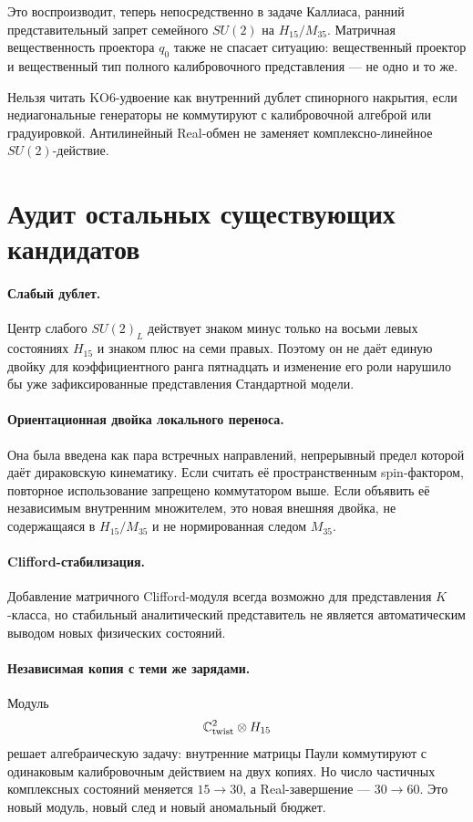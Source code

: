 Это воспроизводит, теперь непосредственно в задаче Каллиаса, ранний
представительный запрет семейного $SU(2)$ на $H_{15}/M_{35}$. Матричная
вещественность проектора $q_0$ также не спасает ситуацию: вещественный
проектор и вещественный тип полного калибровочного представления --- не
одно и то же.

\begin{nogocriterion}
Нельзя читать KO6-удвоение как внутренний дублет спинорного накрытия, если
недиагональные генераторы не коммутируют с калибровочной алгеброй или
градуировкой. Антилинейный Real-обмен не заменяет комплексно-линейное
$SU(2)$-действие.
\end{nogocriterion}

\section{Аудит остальных существующих кандидатов}

\paragraph{Слабый дублет.}
Центр слабого $SU(2)_L$ действует знаком минус только на восьми левых
состояниях $H_{15}$ и знаком плюс на семи правых. Поэтому он не даёт
единую двойку для коэффициентного ранга пятнадцать и изменение его роли
нарушило бы уже зафиксированные представления Стандартной модели.

\paragraph{Ориентационная двойка локального переноса.}
Она была введена как пара встречных направлений, непрерывный предел
которой даёт дираковскую кинематику. Если считать её пространственным
spin-фактором, повторное использование запрещено коммутатором выше. Если
объявить её независимым внутренним множителем, это новая внешняя двойка,
не содержащаяся в $H_{15}/M_{35}$ и не нормированная следом $M_{35}$.

\paragraph{Clifford-стабилизация.}
Добавление матричного Clifford-модуля всегда возможно для представления
$K$-класса, но стабильный аналитический представитель не является
автоматическим выводом новых физических состояний.

\paragraph{Независимая копия с теми же зарядами.}
Модуль
\begin{equation}
 \mathbb C^2_{\rm twist}\otimes H_{15}
\end{equation}
решает алгебраическую задачу: внутренние матрицы Паули коммутируют с
одинаковым калибровочным действием на двух копиях. Но число частичных
комплексных состояний меняется $15\to30$, а Real-завершение ---
$30\to60$. Это новый модуль, новый след и новый аномальный бюджет.

